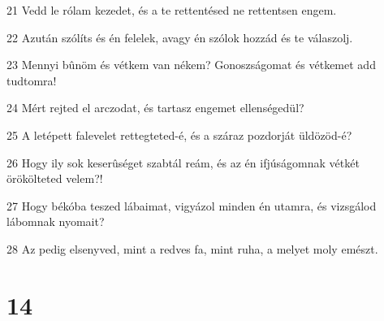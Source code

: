 \par 21 Vedd le rólam kezedet, és a te rettentésed ne rettentsen engem.
\par 22 Azután szólíts és én felelek, avagy én szólok hozzád és te válaszolj.
\par 23 Mennyi bûnöm és vétkem van nékem? Gonoszságomat és vétkemet add tudtomra!
\par 24 Mért rejted el arczodat, és tartasz engemet ellenségedül?
\par 25 A letépett falevelet rettegteted-é, és a száraz pozdorját üldözöd-é?
\par 26 Hogy ily sok keserûséget szabtál reám, és az én ifjúságomnak vétkét örökölteted velem?!
\par 27 Hogy békóba teszed lábaimat, vigyázol minden én utamra, és vizsgálod lábomnak nyomait?
\par 28 Az pedig elsenyved, mint a redves fa, mint ruha, a melyet moly emészt.

\chapter{14}

